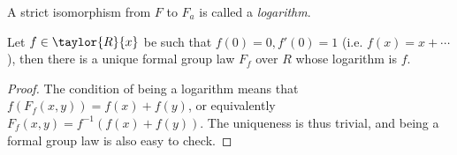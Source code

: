 \begin{definition*}
	A strict isomorphism from $F$ to $F_a$ is called a \emph{logarithm}.
\end{definition*}

\begin{claim*}
	Let $f \in \taylor{R}{x}$ be such that $f\left(0\right) = 0, f'\left(0\right) = 1$ (i.e. $f\left(x\right) = x + \cdots$),
	then there is a unique formal group law $F_f$ over $R$ whose logarithm is $f$.
\end{claim*}

\begin{proof}
	The condition of being a logarithm means that $f\left(F_f\left(x,y\right)\right) = f\left(x\right) + f\left(y\right)$, or equivalently $F_f\left(x,y\right) = f^{-1}\left(f\left(x\right) + f\left(y\right)\right)$.
	The uniqueness is thus trivial, and being a formal group law is also easy to check.
\end{proof}